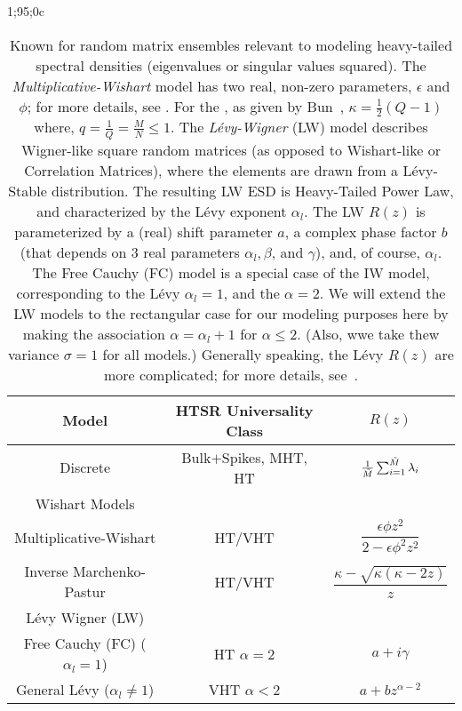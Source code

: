 1;95;0c%
\begin{table}[h!]
  \centering
  \renewcommand{\arraystretch}{1.25} %
\begin{tabular}{|c|c|c|}
  \hline
  Model & \textbf{HTSR Universality Class} & \textbf{$R(z)$}\\  \hline
  \hline
  Discrete & Bulk$+$Spikes, MHT, HT & $\tfrac{1}{\tilde{M}}\sum_{i=1}^{\tilde{M}}\lambda_{i}$   \\ \hline
  \hline
  Wishart Models & &\\ \hline
  Multiplicative-Wishart & HT/VHT& $\dfrac{\epsilon\phi z^2}{2 - \epsilon\phi^2 z^2}$ \\  \hline
  Inverse Marchenko-Pastur & HT/VHT &  $\dfrac{\kappa-\sqrt{\kappa(\kappa-2z)}}{z}$   \\  \hline
  \hline
  L\'evy Wigner (LW) &   & \\  \hline
  Free Cauchy (FC) ($\alpha_{l}=1$) & HT $\alpha=2$ & $a+i\gamma$ \\ \hline
  General L\'evy  ($\alpha_{l}\ne 1$) & VHT $\alpha<2$   & $a+bz^{\alpha-2}$ \\  \hline
\end{tabular}
  \caption{Known \RTransforms for random matrix ensembles relevant to modeling heavy-tailed spectral densities (eigenvalues or singular values squared).
    The \emph{Multiplicative-Wishart} model has two real, non-zero parameters, $\epsilon$ and $\phi$; for more details,
    see \cite{PW16_NIPS}.
  For the \emph{\InverseMP}, as given by Bun~\cite{BunThesis}, $\kappa=\frac{1}{2}(Q-1)$ where, $q=\frac{1}{Q}=\frac{M}{N}\le 1$.
  The \emph{L\'evy-Wigner} (LW) model describes Wigner-like square random matrices
  (as opposed to Wishart-like or Correlation Matrices), where the elements are drawn from a L\'evy-Stable distribution.
  The resulting LW ESD is Heavy-Tailed Power Law, and characterized by the L\'evy exponent $\alpha_{l}$.
  The LW $R(z)$ is parameterized by a (real) shift parameter $a$,
  a complex phase factor $b$ (that depends on 3 real parameters   $\alpha_{l}, \beta$, and $\gamma$),
  and, of course, $\alpha_{l}$.
  The Free Cauchy (FC) model is a special case of the IW model, corresponding to the L\'evy $\alpha_{l}=1$, and the \HTSR $\alpha=2$. 
  We will extend the LW models to the rectangular case for our modeling purposes here by making
  the association   $\alpha = \alpha_{l}+1$ for $\alpha\le 2$.
   (Also, wwe take thew variance $\sigma=1$ for all models.)
   Generally speaking, the L\'evy $R(z)$ are more complicated; 
   for more details, see~\cite{BJNx01_TR,BJNx06_TR,BJ09_TR}.
}
\label{tab:known_r_transforms}
\end{table}

